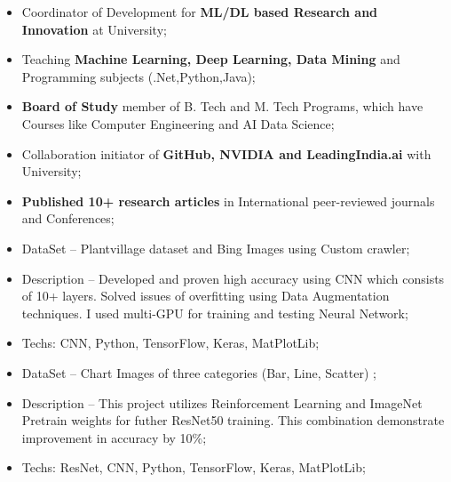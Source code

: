 \documentclass[10pt,a4paper]{altacv}
\begin{document}
\divider
%



\begin{itemize}
  \item Coordinator of Development for \textbf{ML/DL based Research and Innovation} at University;   
  \item Teaching \textbf{Machine Learning, Deep Learning, Data Mining} and Programming subjects (.Net,Python,Java);
  \item \textbf{Board of Study} member of B. Tech and M. Tech Programs, which have Courses like Computer Engineering and AI Data Science;  
  \item Collaboration initiator of \textbf{GitHub, NVIDIA and LeadingIndia.ai} with University;
  \item \textbf{Published 10+ research articles} in International peer-reviewed journals and Conferences; 
\end{itemize}


\medskip

\clearpage





\begin{itemize}
  \item DataSet -- Plantvillage dataset and Bing Images using Custom crawler;
  \item Description -- Developed and proven high accuracy using CNN which consists of 10+ layers. Solved issues of overfitting using Data Augmentation techniques. I used multi-GPU for training and testing Neural Network;
  \item Techs: CNN, Python, TensorFlow, Keras, MatPlotLib;
\end{itemize}

\divider

\begin{itemize}
  \item DataSet -- Chart Images of three categories (Bar, Line, Scatter) ;
  \item Description -- This project utilizes Reinforcement Learning and ImageNet Pretrain weights for futher ResNet50 training. This combination demonstrate improvement in accuracy by 10\%;
  \item Techs: ResNet, CNN, Python, TensorFlow, Keras, MatPlotLib;
\end{itemize}
\end{document}
